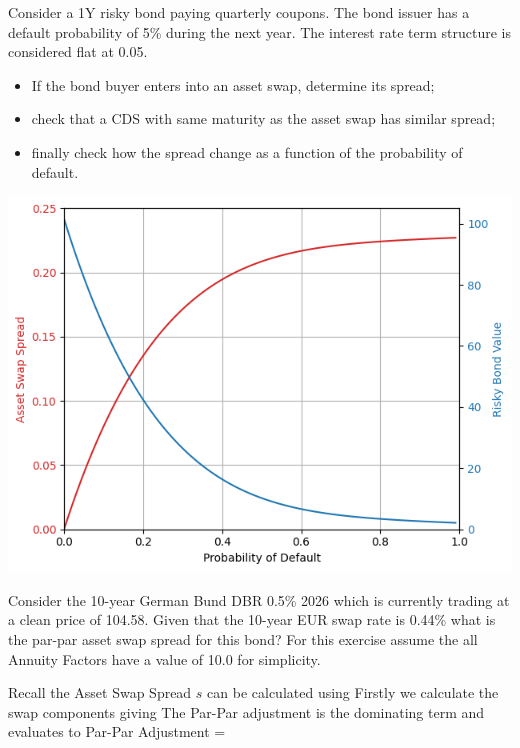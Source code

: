 \documentclass[12pt,a4paper]{article}
\begin{document}
\begin{question}
Consider a 1Y risky bond paying quarterly coupons. The bond issuer has a default probability of 5\% during the next year. The interest rate term structure is considered flat at 0.05.

\begin{itemize}
\item If the bond buyer enters into an asset swap, determine its spread;
\item check that a CDS with same maturity as the asset swap has similar spread;
\item finally check how the spread change as a function of the probability of default.
\end{itemize}
\begin{center}
	\includegraphics[width=0.6\linewidth]{addons/asset_swap_spread}
\end{center}
\end{question}

\begin{question}
	Consider the 10-year German Bund DBR 0.5\% 2026 which is currently trading at a clean price of 104.58. 
	Given that the 10-year EUR swap rate is 0.44\% what is the par-par asset swap spread for this bond? 
	For this exercise assume the all Annuity Factors have a value of 10.0 for simplicity.
\end{question}
Recall the Asset Swap Spread $s$ can be calculated using 
Firstly we calculate the swap components giving 
The Par-Par adjustment is the dominating term and evaluates to
Par-Par Adjustment =

%
%
\end{document}
